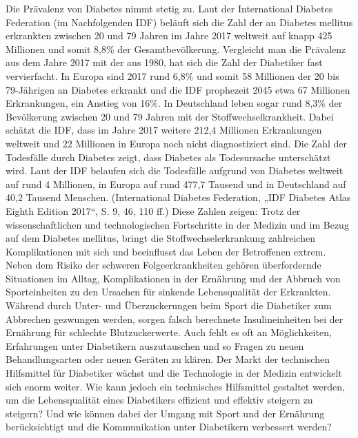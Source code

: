 \documentclass[a4paper,11pt]{article}%
\renewcommand{\\}{\vspace*{0.5\baselineskip} \newline}
\begin{document}
Die Prävalenz von Diabetes nimmt stetig zu. Laut der International Diabetes Federation (im Nachfolgenden IDF) beläuft sich die Zahl der an Diabetes mellitus erkrankten zwischen 20 und 79 Jahren im Jahre 2017 weltweit auf knapp 425 Millionen 
und somit 8,8\% der Gesamtbevölkerung. Vergleicht man die Prävalenz aus dem Jahre 2017 mit der aus 1980, hat sich die Zahl der Diabetiker fast vervierfacht.\newline
In Europa sind 2017 rund 6,8\% und somit 58 Millionen der 20 bis 79-Jährigen an Diabetes erkrankt und die IDF prophezeit 2045 etwa 67 Millionen Erkrankungen, ein Anstieg von 16\%. 
In Deutschland leben sogar rund 8,3\% der Bevölkerung zwischen 20 und 79 Jahren mit der Stoffwechselkrankheit. Dabei schätzt die IDF, dass im Jahre 2017 weitere 212,4 Millionen 
Erkrankungen weltweit und 22 Millionen in Europa noch nicht diagnostiziert sind.\newline
Die Zahl der Todesfälle durch Diabetes zeigt, dass Diabetes als Todesursache unterschätzt wird. 
Laut der IDF belaufen sich die Todesfälle aufgrund von Diabetes weltweit auf rund 4 Millionen, in Europa auf rund 477,7 Tausend und in Deutschland auf 40,2 Tausend Menschen. 
(International Diabetes Federation, „IDF Diabetes Atlas Eighth Edition 2017“, S. 9, 46, 110 ff.)\\
Diese Zahlen zeigen: Trotz der wissenschaftlichen und technologischen Fortschritte in der Medizin und im Bezug auf dem Diabetes mellitus, 
bringt die Stoffwechselerkrankung zahlreichen Komplikationen mit sich und beeinflusst das Leben der Betroffenen extrem. 
Neben dem Risiko der schweren Folgeerkrankheiten gehören überfordernde Situationen im Alltag, Komplikationen in der Ernährung und 
der Abbruch von Sporteinheiten zu den Ursachen für sinkende Lebensqualität der Erkrankten. \newline
Während durch Unter- und Überzuckerungen beim Sport die Diabetiker zum Abbrechen gezwungen werden, sorgen falsch berechnete Insulineinheiten bei der Ernährung für schlechte Blutzuckerwerte. 
Auch fehlt es oft an Möglichkeiten, Erfahrungen unter Diabetikern auszutauschen und so Fragen zu neuen Behandlungsarten oder neuen Geräten zu klären. \newline
Der Markt der technischen Hilfsmittel für Diabetiker wächst und die Technologie in der Medizin entwickelt sich enorm weiter. Wie kann jedoch ein technisches Hilfsmittel gestaltet werden, um die Lebensqualität eines
Diabetikers effizient und effektiv steigern zu steigern? Und wie können dabei der Umgang mit Sport und der Ernährung berücksichtigt und die Kommunikation unter Diabetikern verbessert werden?\\
\end{document}
